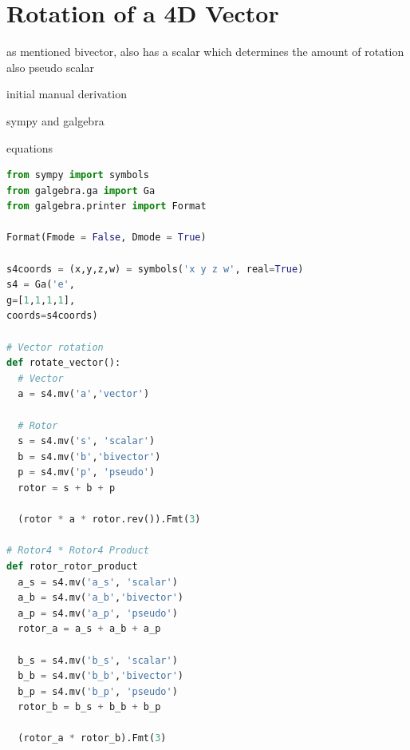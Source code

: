\documentclass{l4proj}
\begin{document}
\section{Rotation of a 4D Vector}

as mentioned bivector, also has a scalar which determines the amount of rotation\\
also pseudo scalar

\citep{bosch_4d_2011}
\citep{bosch_code_nodate}

initial manual derivation

sympy and galgebra

equations

\begin{lstlisting}[language=python, float, caption={Geometric Algebra Rotor4 Product Derivation}, label=lst:callahan]
from sympy import symbols
from galgebra.ga import Ga
from galgebra.printer import Format

Format(Fmode = False, Dmode = True)

s4coords = (x,y,z,w) = symbols('x y z w', real=True)
s4 = Ga('e',
g=[1,1,1,1],
coords=s4coords)

# Vector rotation
def rotate_vector():
  # Vector
  a = s4.mv('a','vector')

  # Rotor
  s = s4.mv('s', 'scalar')
  b = s4.mv('b','bivector')
  p = s4.mv('p', 'pseudo')
  rotor = s + b + p

  (rotor * a * rotor.rev()).Fmt(3)

# Rotor4 * Rotor4 Product
def rotor_rotor_product
  a_s = s4.mv('a_s', 'scalar')
  a_b = s4.mv('a_b','bivector')
  a_p = s4.mv('a_p', 'pseudo')
  rotor_a = a_s + a_b + a_p

  b_s = s4.mv('b_s', 'scalar')
  b_b = s4.mv('b_b','bivector')
  b_p = s4.mv('b_p', 'pseudo')
  rotor_b = b_s + b_b + b_p

  (rotor_a * rotor_b).Fmt(3)

\end{lstlisting}
\end{document}
